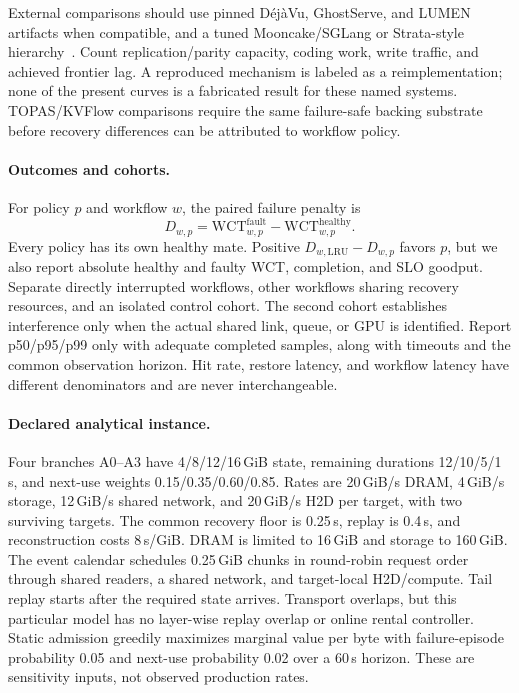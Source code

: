 \documentclass[sigplan,10pt,anonymous,nonacm]{acmart}
\begin{document}
External comparisons should use pinned D\'ej\`aVu, GhostServe, and LUMEN
artifacts when compatible, and a tuned Mooncake/SGLang or Strata-style
hierarchy~\cite{strati2024dejavu,jayakody2026ghostserve,cao2026lumen,qin2025mooncake,xie2026strata}.
Count replication/parity capacity, coding work, write traffic, and achieved
frontier lag. A reproduced mechanism is labeled as a reimplementation;
none of the present curves is a fabricated result for these named systems.
TOPAS/KVFlow comparisons require the same failure-safe backing substrate
before recovery differences can be attributed to workflow policy.

\paragraph{Outcomes and cohorts.}
For policy $p$ and workflow $w$, the paired failure penalty is
\begin{equation}
 D_{w,p}=\mathrm{WCT}^{\mathrm{fault}}_{w,p}
          -\mathrm{WCT}^{\mathrm{healthy}}_{w,p}.
 \label{eq:eval-penalty}
\end{equation}
Every policy has its own healthy mate. Positive
$D_{w,\mathrm{LRU}}-D_{w,p}$ favors $p$, but we also report absolute healthy
and faulty WCT, completion, and SLO goodput. Separate directly interrupted
workflows, other workflows sharing recovery resources, and an isolated
control cohort. The second cohort establishes interference only when
the actual shared link, queue, or GPU is identified. Report p50/p95/p99
only with adequate completed samples, along with timeouts and the common
observation horizon. Hit rate, restore latency, and workflow latency have
different denominators and are never interchangeable.

\paragraph{Declared analytical instance.}
Four branches A0--A3 have 4/8/12/16\,GiB state, remaining durations
12/10/5/1\,s, and next-use weights 0.15/0.35/0.60/0.85. Rates are
20\,GiB/s DRAM, 4\,GiB/s storage, 12\,GiB/s shared network, and
20\,GiB/s H2D per target, with two surviving targets. The common recovery
floor is 0.25\,s, replay is 0.4\,s, and reconstruction costs 8\,s/GiB.
DRAM is limited to 16\,GiB and storage to 160\,GiB. The event calendar
schedules 0.25\,GiB chunks in round-robin request order through shared
readers, a shared network, and target-local H2D/compute. Tail replay starts
after the required state arrives. Transport overlaps, but this particular
model has no layer-wise replay overlap or online rental controller.
Static admission greedily maximizes marginal value per byte with
failure-episode probability 0.05 and next-use probability 0.02 over a
60\,s horizon. These are sensitivity inputs, not observed production rates.
\end{document}
